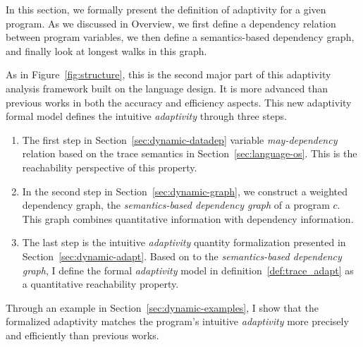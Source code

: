 
In this section, we formally present the definition of adaptivity for a given program.
As we discussed in Overview, we first define a dependency relation between program variables,
we then define a semantics-based dependency graph, and finally look at longest walks in this graph. 

As in Figure~\ref{fig:structure}, this is the second major part of this adaptivity analysis framework
built on the language design. 
It is more advanced than previous works
in both the accuracy and efficiency aspects.
This new adaptivity formal model defines the intuitive \emph{adaptivity} through three steps.

 \begin{enumerate}
 \item The first step in 
 Section~\ref{sec:dynamic-datadep} 
 variable \emph{may-dependency} relation based on the trace semantics in Section~\ref{sec:language-os}.
 This is the reachability perspective of this property.
 \item In the second step in Section~\ref{sec:dynamic-graph}, we construct a weighted dependency graph,
the \emph{semantics-based dependency graph} of a program $c$.
This graph combines quantitative information with dependency information. 

\item The last step is the intuitive \emph{adaptivity} quantity formalization presented in Section~\ref{sec:dynamic-adapt}.
 Based on to the \emph{semantics-based dependency graph},
 I define the formal \emph{adaptivity} model in definition~\ref{def:trace_adapt} as a quantitative reachability property.
\end{enumerate}
 Through an example in Section~\ref{sec:dynamic-examples}, I show that the formalized
adaptivity matches the program's intuitive \emph{adaptivity} more precisely and efficiently than previous works.
